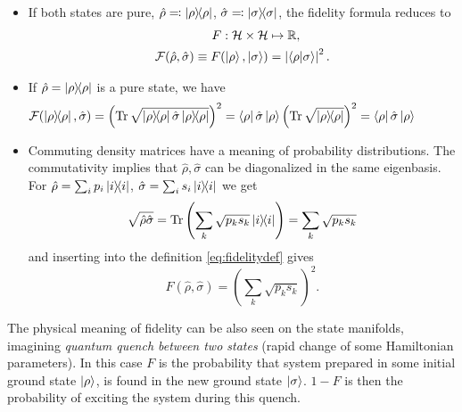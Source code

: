 \begin{itemize}
    \item If both states are pure, $\hat\rho\eqqcolon\ket{\rho}\!\!\bra{\rho}$, $\hat\sigma\eqqcolon\ket{\sigma}\!\!\bra{\sigma}$, the fidelity formula reduces to
    \begin{equation}
        \begin{split}    
            F: \mathcal{H}\times\mathcal{H}&\mapsto \mathbb{R}, \\
            \mathcal F(\hat\rho,\hat\sigma)  \equiv F(\ket{\rho},\ket{\sigma}) &= \left| \braket{\rho|\sigma}\right|^2.
        \end{split}
    \end{equation}

    \item If $\hat\rho=\ket{\rho}\!\!\bra{\rho}$ is a pure state, we have
    \begin{equation}
        \begin{split}
            \hspace{-23pt}\mathcal F(\ket{\rho}\!\!\bra{\rho},\hat\sigma) &= \left(\Tr\sqrt{\ket{\rho}\!\!\bra{\rho}\hat\sigma \ket{\rho}\!\!\bra{\rho}} \right)^2 = \bra{\rho}\hat\sigma \ket{\rho} \left(\Tr\sqrt{\ket{\rho}\!\!\bra{\rho}} \right)^2 = \bra{\rho}\hat\sigma \ket{\rho}
        \end{split}
    \end{equation}
    
    \item Commuting density matrices have a meaning of probability distributions. The commutativity implies that $\hat\rho,\hat\sigma$ can be diagonalized in the same eigenbasis. For $\hat\rho = \sum_i p_i \ket{i}\!\!\bra{i}$, $\hat\sigma = \sum_i s_i \ket{i}\!\!\bra{i}$ we get
    \begin{equation}
        \sqrt{\hat\rho \hat\sigma}=\operatorname{\textrm{Tr}}\left(\sum_k\sqrt{p_k s_k}\ket{i}\!\!\bra{i}\right)=\sum_k\sqrt{p_k s_k}
    \end{equation}
    and inserting into the definition \ref{eq:fidelitydef} gives
    \begin{equation}
        F(\hat\rho,\hat\sigma)=\left(\sum_k\sqrt{p_k s_k}\right)^2.
    \end{equation} 

\end{itemize}
    
    
The physical meaning of fidelity can be also seen on the state manifolds, imagining \emph{quantum quench between two states} (rapid change of some Hamiltonian parameters). In this case $F$ is the probability that system prepared in some initial ground state $\ket{\rho}$, is found in the new ground state $\ket{\sigma}$. $1-F$ is then the probability of exciting the system during this quench.

